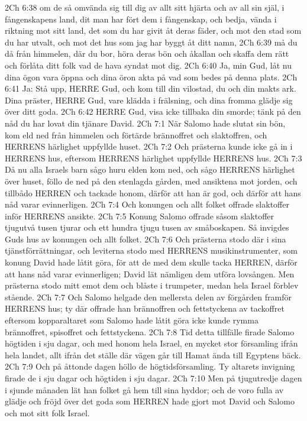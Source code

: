 2Ch 6:38  om de så omvända sig till dig av allt sitt hjärta och av all sin själ, i fångenskapens land, dit man har fört dem i fångenskap, och bedja, vända i riktning mot sitt land, det som du har givit åt deras fäder, och mot den stad som du har utvalt, och mot det hus som jag har byggt åt ditt namn,
2Ch 6:39  må du då från himmelen, där du bor, höra deras bön och åkallan och skaffa dem rätt och förlåta ditt folk vad de hava syndat mot dig.
2Ch 6:40  Ja, min Gud, låt nu dina ögon vara öppna och dina öron akta på vad som bedes på denna plats.
2Ch 6:41  Ja: Stå upp, HERRE Gud, och kom till din vilostad, du och din makts ark. Dina präster, HERRE Gud, vare klädda i frälsning, och dina fromma glädje sig över ditt goda.
2Ch 6:42  HERRE Gud, visa icke tillbaka din smorde; tänk på den nåd du har lovat din tjänare David.
2Ch 7:1  När Salomo hade slutat sin bön, kom eld ned från himmelen och förtärde brännoffret och slaktoffren, och HERRENS härlighet uppfyllde huset.
2Ch 7:2  Och prästerna kunde icke gå in i HERRENS hus, eftersom HERRENS härlighet uppfyllde HERRENS hus.
2Ch 7:3  Då nu alla Israels barn sågo huru elden kom ned, och sågo HERRENS härlighet över huset, föllo de ned på den stenlagda gården, med ansiktena mot jorden, och tillbådo HERREN och tackade honom, därför att han är god, och därför att hans nåd varar evinnerligen.
2Ch 7:4  Och konungen och allt folket offrade slaktoffer inför HERRENS ansikte.
2Ch 7:5  Konung Salomo offrade såsom slaktoffer tjugutvå tusen tjurar och ett hundra tjugu tusen av småboskapen. Så invigdes Guds hus av konungen och allt folket.
2Ch 7:6  Och prästerna stodo där i sina tjänstförrättningar, och leviterna stodo med HERRENS musikinstrumenter, som konung David hade låtit göra, för att de med dem skulle tacka HERREN, därför att hans nåd varar evinnerligen; David lät nämligen dem utföra lovsången. Men prästerna stodo mitt emot dem och blåste i trumpeter, medan hela Israel förblev stående.
2Ch 7:7  Och Salomo helgade den mellersta delen av förgården framför HERRENS hus; ty där offrade han brännoffren och fettstyckena av tackoffret eftersom kopparaltaret som Salomo hade låtit göra icke kunde rymma brännoffret, spisoffret och fettstyckena.
2Ch 7:8  Tid detta tillfälle firade Salomo högtiden i sju dagar, och med honom hela Israel, en mycket stor församling ifrån hela landet, allt ifrån det ställe där vägen går till Hamat ända till Egyptens bäck.
2Ch 7:9  Och på åttonde dagen höllo de högtidsförsamling. Ty altarets invigning firade de i sju dagar och högtiden i sju dagar.
2Ch 7:10  Men på tjugutredje dagen i sjunde månaden lät han folket gå hem till sina hyddor; och de voro fulla av glädje och fröjd över det goda som HERREN hade gjort mot David och Salomo och mot sitt folk Israel.
